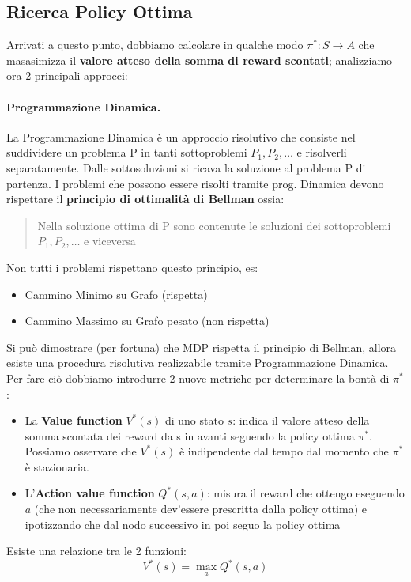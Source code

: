 \subsection{Ricerca Policy Ottima}
Arrivati a questo punto, dobbiamo calcolare in qualche modo $\pi^* : S \rightarrow A$ che masasimizza il \textbf{valore atteso
della somma di reward scontati}; analizziamo ora 2 principali approcci:
\paragraph{Programmazione Dinamica.}La Programmazione Dinamica è un approccio risolutivo che consiste nel suddividere un problema
P in tanti sottoproblemi $P_1,P_2,\dots$ e risolverli separatamente. Dalle sottosoluzioni si ricava la soluzione al problema P di partenza.
I problemi che possono essere risolti tramite prog. Dinamica devono rispettare il \textbf{principio di ottimalità di Bellman} ossia:
\begin{quotation}
    Nella soluzione ottima di P sono contenute le soluzioni dei sottoproblemi $P_1,P_2,\dots$ e viceversa
\end{quotation}
Non tutti i problemi rispettano questo principio, es:
\begin{itemize}
    \item Cammino Minimo su Grafo (rispetta)
    \item Cammino Massimo su Grafo pesato (non rispetta)
\end{itemize}
Si può dimostrare (per fortuna) che MDP rispetta il principio di Bellman, allora esiste una procedura risolutiva realizzabile tramite Programmazione Dinamica.
Per fare ciò dobbiamo introdurre 2 nuove metriche per determinare la bontà di $\pi^*$:
\begin{itemize}
    \item La \textbf{Value function} $V^*(s)$ di uno stato $s$: indica il valore atteso della somma scontata dei reward da s in avanti
    seguendo la policy ottima $\pi^*$. Possiamo osservare che $V^*(s)$ è indipendente dal tempo dal momento che $\pi^*$ è stazionaria.
    \item L'\textbf{Action value function} $Q^*(s,a)$: misura il reward che ottengo eseguendo $a$ (che non necessariamente dev'essere
    prescritta dalla policy ottima) e ipotizzando che dal nodo successivo in poi seguo la policy ottima
\end{itemize}
Esiste una relazione tra le 2 funzioni:
\begin{equation}
    V^*(s) = \max_a Q^*(s,a)
\end{equation}
